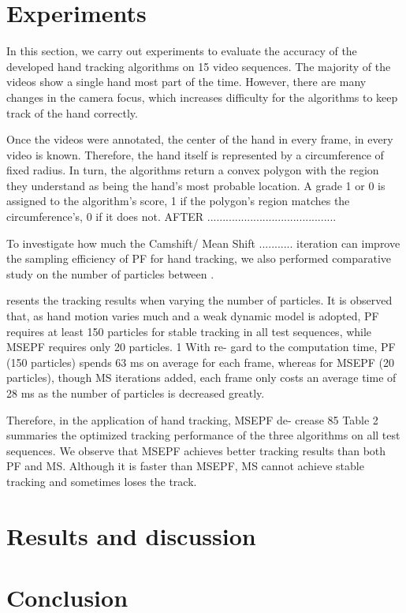 \documentclass[a4paper]{article}
\begin{document}
\section{Experiments}
In this section, we carry out experiments to evaluate the accuracy of the developed hand tracking algorithms on 15 video sequences. The majority of the videos show a single hand most part of the time. However, there are many changes in the camera focus, which increases difficulty for the algorithms to keep track of the hand correctly. 
\par
Once the videos were annotated, the center of the hand in every frame, in every video is known. Therefore, the hand itself is represented by a circumference of fixed radius. In turn, the algorithms return a convex polygon with the region they understand as being the hand's most probable location. A grade 1 or 0 is assigned to the algorithm's score, 1 if the polygon's region matches the circumference's, 0 if it does not. 
AFTER ..........................................


To investigate how much the Camshift/ Mean Shift ........... iteration can
improve the sampling efficiency of PF for hand tracking, we also performed comparative study on the number of particles between .




resents the tracking results
when varying the number of particles. It is observed that, as
hand motion varies much and a weak dynamic model is adopted,
PF requires at least 150 particles for stable tracking in all test
sequences, while MSEPF requires only 20 particles. 1 With re-
gard to the computation time, PF (150 particles) spends 63 ms
on average for each frame, whereas for MSEPF (20 particles),
though MS iterations added, each frame only costs an average
time of 28 ms as the number of particles is decreased greatly.

Therefore, in the application of hand tracking, MSEPF de-
crease 85%
Table 2 summaries the optimized tracking performance of the
three algorithms on all test sequences. We observe that MSEPF
achieves better tracking results than both PF and MS. Although
it is faster than MSEPF, MS cannot achieve stable tracking
and sometimes loses the track.


\section{Results and discussion}
\section{Conclusion}


%


\end{document}
